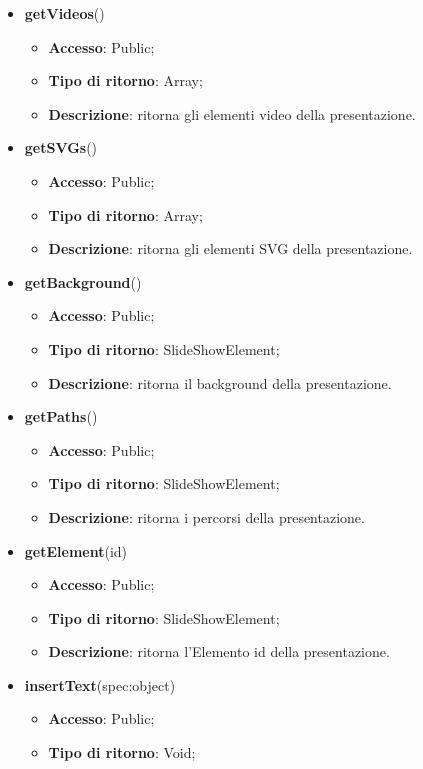 {\begin{itemize}
			\item \textbf{getVideos}()
			\begin{itemize}
				\item \textbf{Accesso}: Public;
				\item \textbf{Tipo di ritorno}: Array;
				\item \textbf{Descrizione}: ritorna gli elementi video della presentazione.
			\end{itemize}
			\item \textbf{getSVGs}()
			\begin{itemize}
				\item \textbf{Accesso}: Public;
				\item \textbf{Tipo di ritorno}: Array;
				\item \textbf{Descrizione}: ritorna gli elementi SVG della presentazione.
			\end{itemize}
			\item \textbf{getBackground}()
			\begin{itemize}
				\item \textbf{Accesso}: Public;
				\item \textbf{Tipo di ritorno}: SlideShowElement;
				\item \textbf{Descrizione}: ritorna il background della presentazione.
			\end{itemize}
			\item \textbf{getPaths}()
			\begin{itemize}
				\item \textbf{Accesso}: Public;
				\item \textbf{Tipo di ritorno}: SlideShowElement;
				\item \textbf{Descrizione}: ritorna i percorsi della presentazione.
			\end{itemize}
			\item \textbf{getElement}(id)
			\begin{itemize}
				\item \textbf{Accesso}: Public;
				\item \textbf{Tipo di ritorno}: SlideShowElement;
				\item \textbf{Descrizione}: ritorna l'Elemento id della presentazione.
			\end{itemize}
			\item \textbf{insertText}(spec:object)
			\begin{itemize}
				\item \textbf{Accesso}: Public;
				\item \textbf{Tipo di ritorno}: Void;

\end{itemize}
\end{itemize}}
